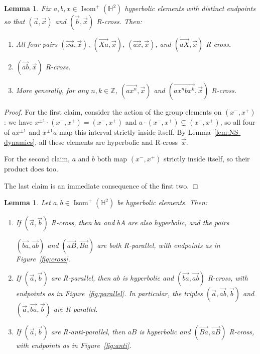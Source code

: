 \documentclass[11pt]{amsart}
\newcommand{\ora}[1]{\overrightarrow{#1}}
\numberwithin{equation}{section}
\numberwithin{figure}{section}
\newtheorem{lemma}[theorem]{Lemma}
\theoremstyle{definition}
\theoremstyle{plain}
\newcommand\bbZ{\ensuremath{\mathbb{Z}}}
\newcommand\bbH{\ensuremath{\mathbb{H}}}
\DeclareMathOperator{\Isom}{Isom}
\begin{document}
\begin{lemma}
  Fix $a,b,x \in \Isom^+(\bbH^2)$ hyperbolic elements with distinct
  endpoints so that $(\ora{a},\ora{x})$ and $(\ora{b},\ora{x})$
  R-cross. Then:
  \begin{enumerate}[label=(\Roman*)]
  \item All four pairs $(\ora{xa},\ora{x})$, $(\ora{Xa},\ora{x})$, $(\ora{ax},\ora{x})$, and
    $(\ora{aX},\ora{x})$ R-cross.
  \item $(\ora{ab},\ora{x})$ R-cross.
  \item More generally, for any $n,k \in \bbZ$, $(\ora{a x^n},\ora{x})$
    and $(\ora{ax^nbx^k},\ora{x})$ R-cross.
  \end{enumerate}
    \label{lem:rhs_prod}
\end{lemma}
\begin{proof}
  For the first claim, consider the action of the group
  elements on $(x^-,x^+)$: we have
  $x^{\pm1} \cdot (x^-,x^+) = (x^-,x^+)$ and
  $a \cdot (x^-,x^+) \subsetneq (x^-,x^+)$, so all four of $ax^{\pm1}$ and
  $x^{\pm1}a$ map this interval strictly inside itself. By Lemma~\ref{lem:NS-dynamics},
  all these elements are hyperbolic and R-cross~$\ora{x}$.

  For the second claim, $a$ and $b$ both map
  $(x^-,x^+)$ strictly inside itself, so their product does too.

  The last claim is an immediate consequence of the first two.
\end{proof}


\begin{lemma} 
  Let $a,b\in \Isom^+(\bbH^2)$ be hyperbolic elements. Then:
  \begin{enumerate}[label=(\Roman*)]
  \item\label{item:ab-cross} If $(\ora{a}, \ora{b})$ R-cross, then $ba$ and $bA$ are also
    hyperbolic, and the pairs

    $(\ora{ba},\ora{ab})$ and $(\ora{aB},\ora{Ba})$ are both
    R-parallel, with endpoints as in Figure~\ref{fig:cross}.
  \item\label{item:ab-parallel} If $(\ora{a},\ora{b})$ are R-parallel, then $ab$ is hyperbolic
    and $(\ora{ba},\ora{ab})$ R-cross, with endpoints as in
    Figure~\ref{fig:parallel}.
    In particular, the triples
    $(\ora{a},\ora{ab}, \ora{b})$ and $(\ora{a},\ora{ba},\ora{b})$ are R-parallel.
  \item If $(\ora{a},\ora{b})$ are R-anti-parallel, then $aB$ is
    hyperbolic and $(\ora{Ba},\ora{aB})$ R-cross, with endpoints as in Figure~\ref{fig:anti}.
  \end{enumerate}
  \label{lem:righthandedfoundation}
\end{lemma}
\end{document}

